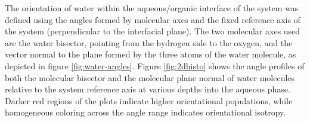 The orientation of water within the aqueous/organic interface of the system was defined using the angles formed by molecular axes and the fixed reference axis of the system (perpendicular to the interfacial plane). The two molecular axes used are the water bisector, pointing from the hydrogen side to the oxygen, and the vector normal to the plane formed by the three atoms of the water molecule, as depicted in figure \ref{fig:water-angles}. Figure \ref{fig:2dhisto} shows the angle profiles of both the molecular bisector and the molecular plane normal of water molecules relative to the system reference axis at various depths into the aqueous phase. Darker red regions of the plots indicate higher orientational populations, while homogeneous coloring across the angle range indicates orientational isotropy.

\newcommand{\degree}{\ensuremath{^\circ}}

